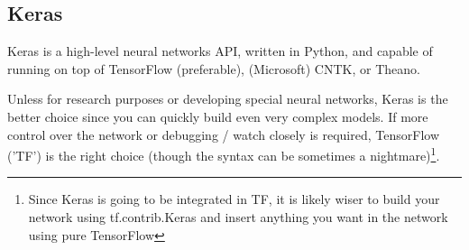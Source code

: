 \documentclass[11pt]{article}
\begin{document}
\subsection{Keras}
Keras is a high-level neural networks API, written in Python, and capable of running on top of TensorFlow (preferable), (Microsoft) CNTK, or Theano.

Unless for research purposes or developing special neural networks, Keras is the better choice since you can quickly build even very complex models. If more control over the network or debugging / watch closely is required, TensorFlow ('TF') is the right choice (though the syntax can be sometimes a nightmare)\footnote{Since Keras is going to be integrated in TF, it is likely wiser to build your network using tf.contrib.Keras and insert anything you want in the network using pure TensorFlow}.
\end{document}
